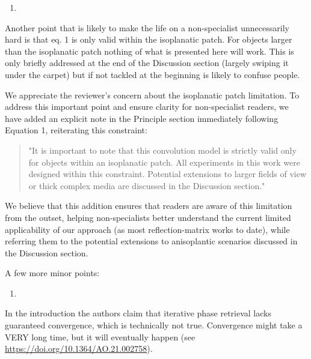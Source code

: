 \documentclass[12pt]{article}
\newenvironment{solved_reviewercomment}
    {\begin{tcolorbox}[width=\linewidth,colback=gray!5,colframe=solved_commentcolor!50,title=Reviewer Comment,left=5pt,right=5pt]}
    {\end{tcolorbox}}
\newenvironment{finished_ourresponse}
    {\begin{tcolorbox}[width=\linewidth,breakable,enhanced,colback=gray!5,colframe=finished_responsecolor!50,title=Response,left=5pt,right=5pt]}
    {\end{tcolorbox}}
\begin{document}
\begin{enumerate}[label=\arabic*., resume]
\item \leavevmode
\end{enumerate}
\vspace{-1em}
\begin{solved_reviewercomment}
    Another point that is likely to make the life on a non-specialist unnecessarily hard is that eq. 1 is only valid within the isoplanatic patch. For objects larger than the isoplanatic patch nothing of what is presented here will work. This is only briefly addressed at the end of the Discussion section (largely swiping it under the carpet) but if not tackled at the beginning is likely to confuse people.
    
\end{solved_reviewercomment}

\begin{finished_ourresponse}
    We appreciate the reviewer's concern about the isoplanatic patch limitation. To address this important point and ensure clarity for non-specialist readers, we have added an explicit note in the Principle section immediately following Equation 1, reiterating this constraint:
    \begin{quote}
        "It is important to note that this convolution model is strictly valid only for objects within an isoplanatic patch. All experiments in this work were designed within this constraint. Potential extensions to larger fields of view or thick complex media are discussed in the Discussion section."
    \end{quote}
            
    
    We believe that this addition ensures that readers are aware of this limitation from the outset, helping non-specialists better understand the current limited applicability of our approach (as most reflection-matrix works to date), while referring them to the potential extensions to anisoplantic scenarios discussed in the  Discussion section.
\end{finished_ourresponse}



A few more minor points:

\begin{enumerate}[label=\arabic*., resume]
\item \leavevmode
\end{enumerate}
\vspace{-1em}
\begin{solved_reviewercomment}
    In the introduction the authors claim that iterative phase retrieval lacks guaranteed convergence, which is technically not true. Convergence might take a VERY long time, but it will eventually happen (see \url{https://doi.org/10.1364/AO.21.002758}).
\end{solved_reviewercomment}
\end{document}
